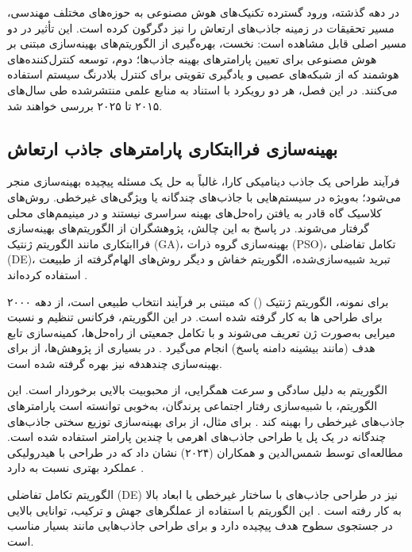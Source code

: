 در دهه گذشته، ورود گسترده تکنیک‌های هوش مصنوعی به حوزه‌های مختلف مهندسی، مسیر تحقیقات در زمینه جاذب‌های ارتعاش را نیز دگرگون کرده است. این تأثیر در دو مسیر اصلی قابل مشاهده است: نخست، بهره‌گیری از الگوریتم‌های بهینه‌سازی مبتنی بر هوش مصنوعی برای تعیین پارامترهای بهینه جاذب‌ها؛ دوم، توسعه کنترل‌کننده‌های هوشمند که از شبکه‌های عصبی و یادگیری تقویتی برای کنترل بلادرنگ سیستم استفاده می‌کنند. در این فصل، هر دو رویکرد با استناد به منابع علمی منتشرشده طی سال‌های ۲۰۱۵ تا ۲۰۲۵ بررسی خواهند شد.

\subsection{بهینه‌سازی فراابتکاری پارامترهای جاذب ارتعاش}

فرآیند طراحی یک جاذب دینامیکی کارا، غالباً به حل یک مسئله پیچیده بهینه‌سازی منجر می‌شود؛ به‌ویژه در سیستم‌هایی با جاذب‌های چندگانه یا ویژگی‌های غیرخطی. روش‌های کلاسیک گاه قادر به یافتن راه‌حل‌های بهینه سراسری نیستند و در مینیمم‌های محلی گرفتار می‌شوند. در پاسخ به این چالش، پژوهشگران از الگوریتم‌های بهینه‌سازی فراابتکاری مانند الگوریتم ژنتیک (GA)، بهینه‌سازی گروه ذرات (PSO)، تکامل تفاضلی (DE)، تبرید شبیه‌سازی‌شده، الگوریتم خفاش و دیگر روش‌های الهام‌گرفته از طبیعت استفاده کرده‌اند \cite{chaudhary2021review}.

برای نمونه، الگوریتم ژنتیک () که مبتنی بر فرآیند انتخاب طبیعی است، از دهه ۲۰۰۰ برای طراحی ها به کار گرفته شده است. در این الگوریتم، فرکانس تنظیم و نسبت میرایی به‌صورت ژن تعریف می‌شوند و با تکامل جمعیتی از راه‌حل‌ها، کمینه‌سازی تابع هدف (مانند بیشینه دامنه پاسخ) انجام می‌گیرد \cite{mohebbi2013designing, colherinhas2019optimal, lavan2017multi, etedali2018optimum}. در بسیاری از پژوهش‌ها، از  برای بهینه‌سازی چندهدفه نیز بهره گرفته شده است.

الگوریتم  به دلیل سادگی و سرعت همگرایی، از محبوبیت بالایی برخوردار است. این الگوریتم، با شبیه‌سازی رفتار اجتماعی پرندگان، به‌خوبی توانسته است پارامترهای جاذب‌های غیرخطی را بهینه کند \cite{balaji2021applications, shami2022particle}. برای مثال، از  برای بهینه‌سازی توزیع سختی جاذب‌های چندگانه در یک پل یا طراحی جاذب‌های اهرمی با چندین پارامتر استفاده شده است. مطالعه‌ای توسط شمس‌الدین و همکاران (۲۰۲۴) نشان داد که  در طراحی  با  هیدرولیکی عملکرد بهتری نسبت به  دارد \cite{shamseldin2024ai}.

الگوریتم تکامل تفاضلی (DE) نیز در طراحی جاذب‌های با ساختار غیرخطی یا ابعاد بالا به کار رفته است \cite{ahmad2022differential}. این الگوریتم با استفاده از عملگرهای جهش و ترکیب، توانایی بالایی در جستجوی سطوح هدف پیچیده دارد و برای طراحی جاذب‌هایی مانند  بسیار مناسب است.

